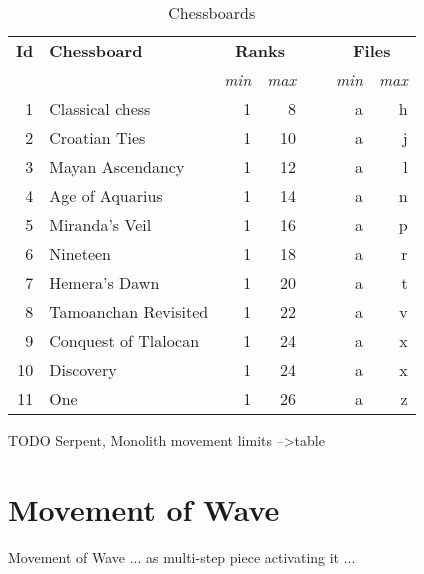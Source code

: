 \begin{table}[!h]
\centering
\begin{tabular}{ rlrrcrr }
\toprule
\textbf{Id} & \textbf{Chessboard} & \multicolumn{2}{c}{ \textbf{Ranks} } & ~ & \multicolumn{2}{c}{ \textbf{Files} } \\ \cmidrule{3-4} \cmidrule{6-7}
            &                     & \emph{min} & \emph{max}              &   & \emph{min} & \emph{max}              \\
\midrule
 1 & Classical chess                  & 1 &  8 & & a & h \\ %
 2 & Croatian Ties                    & 1 & 10 & & a & j \\
 3 & Mayan Ascendancy                 & 1 & 12 & & a & l \\
 4 & Age of Aquarius                  & 1 & 14 & & a & n \\
 5 & Miranda's Veil                   & 1 & 16 & & a & p \\
 6 & Nineteen                         & 1 & 18 & & a & r \\
 7 & Hemera's Dawn                    & 1 & 20 & & a & t \\
 8 & Tamoanchan Revisited             & 1 & 22 & & a & v \\
 9 & Conquest of Tlalocan             & 1 & 24 & & a & x \\
10 & Discovery                        & 1 & 24 & & a & x \\
11 & One                              & 1 & 26 & & a & z \\
\bottomrule
\end{tabular}
\caption{Chessboards}
\label{tbl:Appendix/Chessboards}
\end{table}

\clearpage %

\huge{TODO}
Serpent, Monolith movement limits --\textgreater table
\normalsize{}

\clearpage %

\section*{Movement of Wave}
\label{sec:Appendix/Movement of Wave}

Movement of Wave ... as multi-step piece activating it  ...


